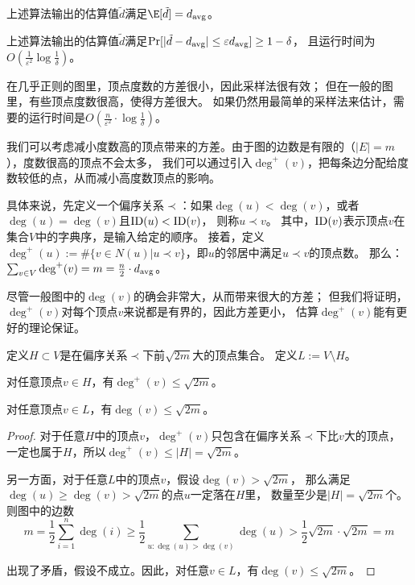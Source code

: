 \begin{claim}
    上述算法输出的估算值$\tilde{d}$满足$\E[\tilde{d}]=d_\avg$。
\end{claim}

\begin{claim}
    上述算法输出的估算值$\tilde{d}$满足$\Pr[|\tilde{d}-d_{\mathrm{avg}}|\le\varepsilon d_{\mathrm{avg}}]\ge1-\delta$，
    且运行时间为$O(\frac{1}{\varepsilon^2}\log\frac{1}{\delta})$。
\end{claim}

在几乎正则的图里，顶点度数的方差很小，因此采样法很有效；
但在一般的图里，有些顶点度数很高，使得方差很大。
如果仍然用最简单的采样法来估计，需要的运行时间是$O(\frac{n}{\varepsilon^2}\cdot\log\frac{1}{\delta})$。

\idea 我们可以考虑减小度数高的顶点带来的方差。由于图的边数是有限的（$|E|=m$），度数很高的顶点不会太多，
我们可以通过引入$\deg^+(v)$，把每条边分配给度数较低的点，从而减小高度数顶点的影响。

具体来说，先定义一个偏序关系$\prec$：如果$\deg(u)<\deg(v)$，或者$\deg(u)=\deg(v)$且$\mathrm{ID}(u)<\mathrm{ID}(v)$，
则称$u\prec v$。
其中，$\mathrm{ID}(v)$表示顶点$v$在集合$V$中的字典序，是输入给定的顺序。
接着，定义$\deg^+(u):=\#\{v\in N(u)|u\prec v\}$，即$u$的邻居中满足$u\prec v$的顶点数。
那么：$\sum_{v\in V}\deg^+(v)=m=\frac{n}{2}\cdot d_{\mathrm{avg}}$。

尽管一般图中的$\deg(v)$的确会非常大，从而带来很大的方差；
但我们将证明，$\deg^+(v)$对每个顶点$v$来说都是有界的，因此方差更小，
估算$\deg^+(v)$能有更好的理论保证。

\begin{definition}
    定义$H\subset V$是在偏序关系$\prec$下前$\sqrt{2m}$大的顶点集合。
    定义$L:=V\setminus H$。
\end{definition}

\begin{claim}\label{claim:LH-bound}
    对任意顶点$v\in H$，有$\deg^+(v)\le\sqrt{2m}$。

    对任意顶点$v\in L$，有$\deg(v)\le\sqrt{2m}$。
\end{claim}
\begin{proof}
    对于任意$H$中的顶点$v$，$\deg^+(v)$只包含在偏序关系$\prec$下比$v$大的顶点，
    一定也属于$H$，所以$\deg^+(v)\le|H|=\sqrt{2m}$。

    另一方面，对于任意$L$中的顶点$v$，假设$\deg(v)>\sqrt{2m}$，
    那么满足$\deg(u)\ge\deg(v)>\sqrt{2m}$的点$u$一定落在$H$里，
    数量至少是$|H|=\sqrt{2m}$个。则图中的边数
    \[
    m=\frac{1}{2}\sum_{i=1}^n\deg(i)
    \ge\frac{1}{2}\sum_{u:\deg(u)>\deg(v)}\deg(u)
    >\frac{1}{2}\sqrt{2m}\cdot\sqrt{2m} =m
    \]

    出现了矛盾，假设不成立。因此，对任意$v\in L$，有$\deg(v)\le\sqrt{2m}$。
\end{proof}


